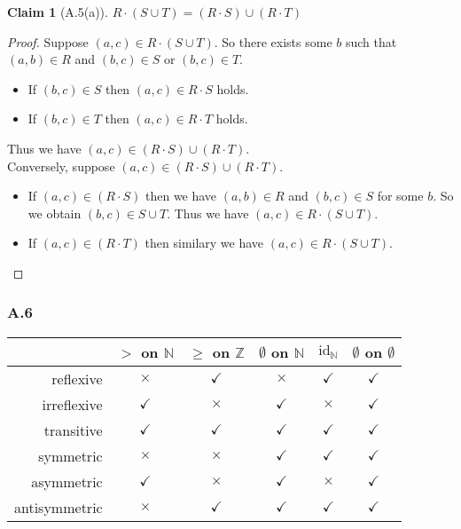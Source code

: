 \documentclass[12pt,aspectratio=169]{beamer}
\theoremstyle{claim}
\newtheorem{claim}[theorem]{Claim}%
\begin{document}
\begin{frame}
    \begin{claim}[A.5(a)]
        $R \cdot (S \cup T) = (R \cdot S) \cup (R \cdot T)$
    \end{claim}

    \begin{proof}
        Suppose $(a,c) \in R \cdot (S \cup T)$.
        So there exists some $b$ such that $(a,b) \in R$ and $(b,c) \in S$ or $(b,c) \in T$.
        \begin{itemize}
            \item If $(b,c) \in S$ then $(a,c) \in R \cdot S$ holds.
            \item If $(b,c) \in T$ then $(a,c) \in R \cdot T$ holds.
        \end{itemize}
        Thus we have $(a,c) \in (R \cdot S) \cup (R \cdot T)$.\\
        Conversely, suppose $(a,c) \in (R \cdot S) \cup (R \cdot T)$.
        \begin{itemize}
            \item If $(a,c) \in (R \cdot S)$ then we have $(a,b) \in R$ and $(b,c) \in S$ for some $b$.
            So we obtain $(b,c) \in S \cup T$. Thus we have $(a,c) \in R \cdot (S \cup T)$.
            \item If $(a,c) \in (R \cdot T)$ then similary we have $(a,c) \in R \cdot (S \cup T)$.
        \end{itemize}
    \end{proof}
\end{frame}

\begin{frame}
    \frametitle{A.6}
    \newcommand{\yes}{\color{green}$\checkmark$}
    \newcommand{\no}{\color{red}$\times$}
    \begin{table}
        \centering
    \begin{tabular}{r|ccccc}
        & $>$ on $\mathbb{N}$ & $\geq$ on $\mathbb{Z}$ & $\emptyset$ on $\mathbb{N}$ & $\mathrm{id}_{\mathbb{N}}$ & $\emptyset$ on $\emptyset$ \\ \hline
        reflexive     & \no  & \yes & \no  & \yes & \yes \\
        irreflexive   & \yes & \no  & \yes & \no  & \yes \\
        transitive    & \yes & \yes & \yes & \yes & \yes \\
        symmetric     & \no  & \no  & \yes & \yes & \yes \\
        asymmetric    & \yes & \no  & \yes & \no  & \yes \\
        antisymmetric & \no  & \yes & \yes & \yes & \yes \\
    \end{tabular}
    \end{table}
\end{frame}
\end{document}
